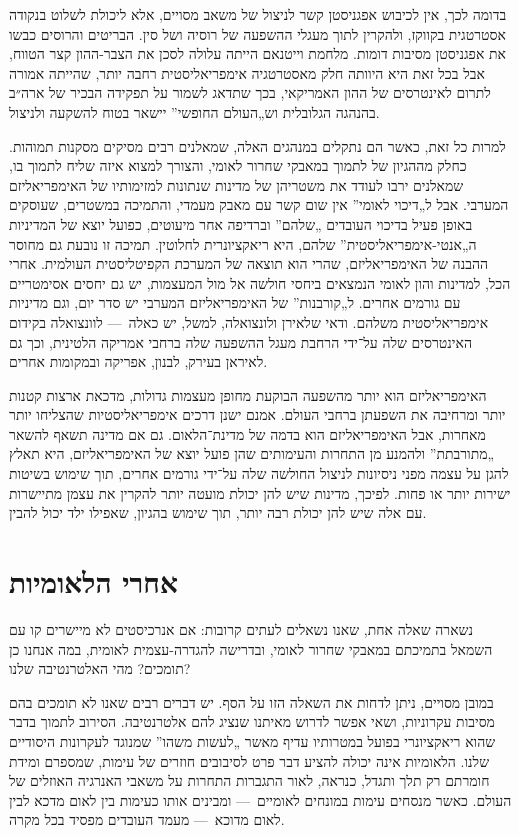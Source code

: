 בדומה לכך, אין לכיבוש אפגניסטן קשר לניצול של משאב מסויים, אלא ליכולת לשלוט בנקודה אסטרטגית בקווקז, ולהקרין לתוך מעגלי ההשפעה של רוסיה ושל סין. הבריטים והרוסים כבשו את אפגניסטן מסיבות דומות. מלחמת וייטנאם הייתה עלולה לסכן את הצבר-ההון קצר הטווח, אבל בכל זאת היא היוותה חלק מאסטרטגיה אימפריאליסטית רחבה יותר, שהייתה אמורה לתרום לאינטרסים של ההון האמריקאי, בכך שתדאג לשמור על תפקידה הבכיר של ארה״ב בהנהגה הגלובלית וש„העולם החופשי” יישאר בטוח להשקעה ולניצול.

למרות כל זאת, כאשר הם נתקלים במנהגים האלה, שמאלנים רבים מסיקים מסקנות תמוהות. כחלק מההגיון של לתמוך במאבקי שחרור לאומי, והצורך למצוא איזה שליח לתמוך בו, שמאלנים ירבו לעודד את משטריהן של מדינות שנתונות למזימותיו של האימפריאליזם המערבי. אבל ל„דיכוי לאומי” אין שום קשר עם מאבק מעמדי, והתמיכה במשטרים, שעוסקים באופן פעיל בדיכוי העובדים „שלהם” וברדיפה אחר מיעוטים, כפועל יוצא של המדיניות ה„אנטי-אימפריאליסטית” שלהם, היא ריאקציונרית לחלוטין. תמיכה זו נובעת גם מחוסר ההבנה של האימפריאליזם, שהרי הוא תוצאה של המערכת הקפיטליסטית העולמית. אחרי הכל, למדינות והון לאומי הנמצאים ביחסי חולשה אל מול המעצמות, יש גם יחסים אסימטריים עם גורמים אחרים. ל„קורבנות” של האימפריאליזם המערבי יש סדר יום, וגם מדיניות אימפריאליסטית משלהם. ודאי שלאירן ולונצואלה, למשל, יש כאלה~— לוונצואלה בקידום האינטרסים שלה על־ידי הרחבת מעגל ההשפעה שלה ברחבי אמריקה הלטינית, וכך גם לאיראן בעירק, לבנון, אפריקה ובמקומות אחרים.

האימפריאליזם הוא יותר מהשפעה הבוקעת מחופן מעצמות גדולות, מדכאת ארצות קטנות יותר ומרחיבה את השפעתן ברחבי העולם. אמנם ישנן דרכים אימפריאליסטיות שהצליחו יותר מאחרות, אבל האימפריאליזם הוא בדמה של מדינת־הלאום. גם אם מדינה תשאף להשאר „מתורבתת” ולהמנע מן התחרות והעימותים שהן פועל יוצא של האימפריאליזם, היא תאלץ להגן על עצמה מפני ניסיונות לניצול החולשה שלה על־ידי גורמים אחרים, תוך שימוש בשיטות ישירות יותר או פחות. לפיכך, מדינות שיש להן יכולת מועטה יותר להקרין את עצמן מתיישרות עם אלה שיש להן יכולת רבה יותר, תוך שימוש בהגיון, שאפילו ילד יכול להבין.



\section*{אחרי הלאומיות}

נשארה שאלה אחת, שאנו נשאלים לעתים קרובות: אם אנרכיסטים לא מיישרים קו עם השמאל בתמיכתם במאבקי שחרור לאומי, ובדרישה להגדרה-עצמית לאומית, במה אנחנו כן תומכים? מהי האלטרנטיבה שלנו?

במובן מסויים, ניתן לדחות את השאלה הזו על הסף. יש דברים רבים שאנו לא תומכים בהם מסיבות עקרוניות, ושאי אפשר לדרוש מאיתנו שנציג להם אלטרנטיבה. הסירוב לתמוך בדבר שהוא ריאקציונרי בפועל במטרותיו עדיף מאשר „לעשות משהו” שמנוגד לעקרונות היסודיים שלנו. הלאומיות אינה יכולה להציע דבר פרט לסיבובים חוזרים של עימות, שמספרם ומידת חומרתם רק תלך ותגדל, כנראה, לאור התגברות התחרות על משאבי האנרגיה האוזלים של העולם. כאשר מנסחים עימות במונחים לאומיים~— ומבינים אותו כעימות בין לאום מדכא לבין לאום מדוכא~— מעמד העובדים מפסיד בכל מקרה.

